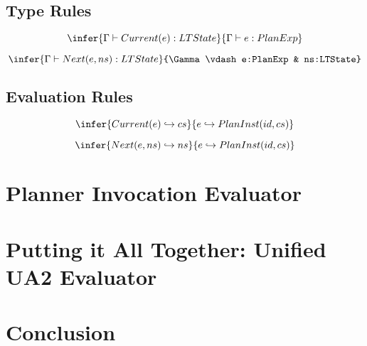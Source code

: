 \subsection{Type Rules}

$$
\infer{\Gamma\vdash Current(e):LTState}{\Gamma\vdash e:PlanExp}
$$

$$
\infer{\Gamma\vdash Next(e, ns):LTState}{\Gamma\vdash e:PlanExp & ns:LTState}
$$

\subsection{Evaluation Rules}
$$
\infer{Current(e) \hookrightarrow cs}{e \hookrightarrow PlanInst(id,cs)}
$$

$$
\infer{Next(e,ns) \hookrightarrow ns}{e \hookrightarrow PlanInst(id,cs)}
$$

\section{Planner Invocation Evaluator}

\section{Putting it All Together: Unified UA2 Evaluator}

\section{Conclusion}


